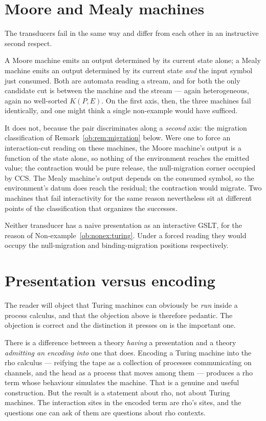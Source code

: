 \section{Moore and Mealy machines}

The transducers fail in the same way and differ from each other in an instructive
second respect.

A Moore machine emits an output determined by its current state alone; a Mealy machine
emits an output determined by its current state \emph{and} the input symbol just
consumed. Both are automata reading a stream, and for both the only candidate cut is
between the machine and the stream --- again heterogeneous, again no well-sorted
$K(P,E)$. On the first axis, then, the three machines fail identically, and one might
think a single non-example would have sufficed.

It does not, because the pair discriminates along a \emph{second} axis: the migration
classification of Remark~\ref{ob:rem:migration} below. Were one to force an interaction-cut
reading on these machines, the Moore machine's output is a function of the state alone,
so nothing of the environment reaches the emitted value; the contraction would be pure
release, the null-migration corner occupied by CCS. The Mealy machine's output depends
on the consumed symbol, so the environment's datum does reach the residual; the
contraction would migrate. Two machines that fail interactivity for the same reason
nevertheless sit at different points of the classification that organizes the successes.

\begin{nonexample}
Neither transducer has a naive presentation as an interactive GSLT, for the reason of
Non-example~\ref{ob:nonex:turing}. Under a forced reading they would occupy the
null-migration and binding-migration positions respectively.
\end{nonexample}

\section{Presentation versus encoding}

The reader will object that Turing machines can obviously be \emph{run} inside a process
calculus, and that the objection above is therefore pedantic. The objection is correct
and the distinction it presses on is the important one.

There is a difference between a theory \emph{having} a presentation and a theory
\emph{admitting an encoding into} one that does. Encoding a Turing machine into the rho
calculus --- reifying the tape as a collection of processes communicating on channels,
and the head as a process that moves among them --- produces a rho term whose behaviour
simulates the machine. That is a genuine and useful construction. But the result is a
statement about rho, not about
Turing machines. The interaction sites in the encoded term are rho's sites, and the
questions one can ask of them are questions about rho contexts.

